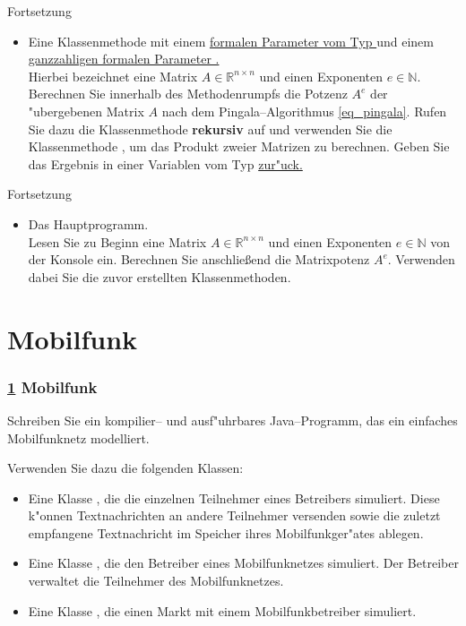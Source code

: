 \documentclass[9pt,german]{beamer}%
\begin{document}
\begin{frame}
Fortsetzung
\begin{itemize}
  \item Eine Klassenmethode  mit einem \underline{formalen Parameter \linebreak {} vom Typ  }
  und einem \underline{ganzzahligen formalen Parameter .}\\
  Hierbei bezeichnet  eine Matrix $A\in\mathbb R^{n\times n}$
  und  einen Exponenten $e\in\mathbb N$. Berechnen Sie innerhalb des Methodenrumpfs die Potzenz $A^e$ der
  "ubergebenen Matrix $A$ nach dem Pingala--Algorithmus \eqref{eq_pingala}. Rufen Sie dazu die Klassenmethode
   \textbf{rekursiv} auf und verwenden Sie die Klassenmethode , um das Produkt zweier
  Matrizen zu berechnen. Geben Sie das Ergebnis in einer Variablen vom Typ \underline{ zur"uck.}
\end{itemize}
\end{frame}

\begin{frame}
Fortsetzung
\begin{itemize}
  \item Das Hauptprogramm.\\
  Lesen Sie zu Beginn eine Matrix $A\in\mathbb R^{n\times n}$ und einen Exponenten $e\in\mathbb N$ von der Konsole ein.
  Berechnen Sie anschlie\ss end die Matrixpotenz $A^e$. Verwenden dabei Sie die zuvor erstellten Klassenmethoden.
\end{itemize}
\end{frame}


\def\stitle{Mobilfunk}
\section{\stitle}\label{S:mobil}
\begin{frame}[t]%
  \frametitle{\ref{S:mobil} \stitle}
Schreiben Sie ein kompilier-- und ausf"uhrbares Java--Programm, das ein einfaches Mobil\-funk\-netz
modelliert.


Verwenden Sie dazu die folgenden Klassen:
\begin{itemize}
\item
Eine Klasse , die die einzelnen Teilnehmer
eines Betreibers simuliert. Diese k"onnen Textnachrichten
an andere Teilnehmer versenden sowie die zuletzt empfangene
Textnachricht im Speicher ihres Mobilfunkger"ates ablegen.
\item
Eine Klasse , die den Betreiber
eines Mobilfunknetzes simuliert.
Der Betreiber verwaltet die Teilnehmer des Mobilfunknetzes.
\item
Eine Klasse , die einen Markt mit einem
Mobilfunkbetreiber simuliert.
\end{itemize}

\end{frame}
\end{document}
